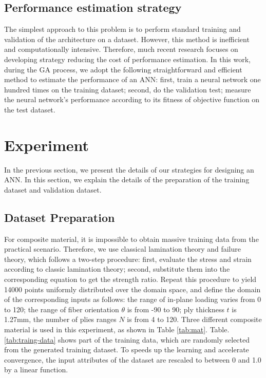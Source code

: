 \documentclass[letterpaper]{IEEEtran}
\begin{document}
\subsection{Performance estimation strategy}
The simplest approach to this problem is to perform standard training and
validation of the architecture on a dataset. However, this method is inefficient
and computationally intensive. Therefore, much recent
research\cite{baker2017accelerating} focuses on developing strategy reducing the
cost of performance estimation. In this work, during the GA process, we adopt
the following straightforward and efficient method to estimate the performance
of an ANN: first, train a neural network one hundred times on the training
dataset; second, do the validation test; measure the neural network's
performance according to its fitness of objective function on the test dataset.  


\section{Experiment}
In the previous section, we present the details of our strategies for designing
an ANN. In this section, we explain the details of the preparation of the
training dataset and validation dataset.

\subsection{Dataset Preparation}
For composite material, it is impossible to obtain massive training data from
the practical scenario. Therefore, we use classical lamination theory and
failure theory, which follows a two-step procedure: first, evaluate the stress
and strain according to classic lamination theory; second, substitute them into
the corresponding equation to get the strength ratio. Repeat this procedure to
yield 14000 points uniformly distributed over the domain space, and define the
domain of the corresponding inputs as follows: the range of in-plane loading
varies from 0 to 120; the range of fiber orientation $\theta$ is from -90 to 90;
ply thickness $t$ is 1.27mm, the number of plies ranges $N$ is from 4 to 120.
Three different composite material is used in this experiment, as shown in Table
\ref{tab:mat}. Table. \ref{tab:traing-data} shows part of the training data, which
are randomly selected from the generated training dataset.  To speeds up the
learning and accelerate convergence, the input attributes of the dataset are
rescaled to between 0 and 1.0 by a linear function.
\end{document}
